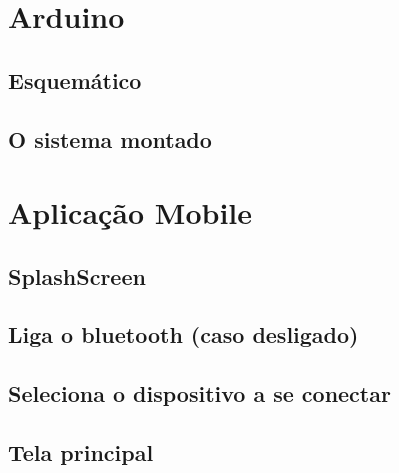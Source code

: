 \documentclass[12pt,a4paper]{article}
\begin{document}
\newpage
\section{Arduino}
\subsection{Esquemático}
\subsection{O sistema montado}

\section{Aplicação Mobile}
\subsection{SplashScreen}
\subsection{Liga o bluetooth (caso desligado)}
\subsection{Seleciona o dispositivo a se conectar}
\subsection{Tela principal}
\end{document}
